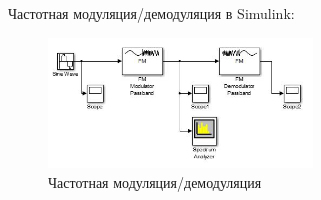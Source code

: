\documentclass[10pt,a4paper]{article}
\begin{document}
Частотная модуляция/демодуляция в Simulink:
\begin{figure}[h]\centering
    \includegraphics[width=7cm]{sim_f} 
    \caption{Частотная модуляция/демодуляция}\label{fig.sim_f}
\end{figure}                                                                                                                                                                                                                                                                                                                                                                                                                                                                                                                                                                                                                                                                                                                                                                                                                                                                                                                                                                                                                                                                                                                                                                                                                                                                                                                                                                                                                                                                       
\end{document}
